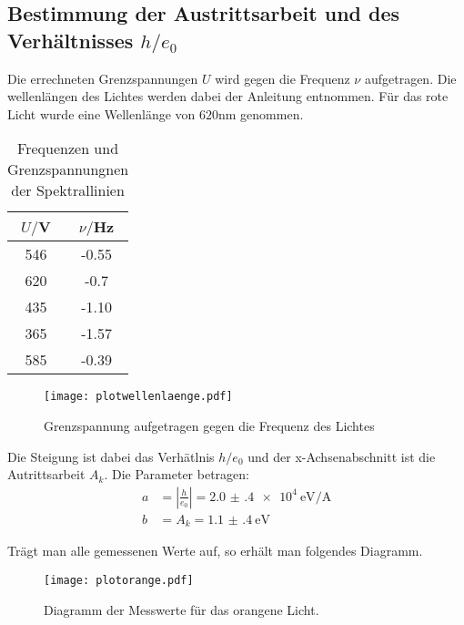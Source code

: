 \subsection{Bestimmung der Austrittsarbeit und des Verhältnisses $h/e_0$}

Die errechneten Grenzspannungen $U$ wird gegen die Frequenz $\nu$ aufgetragen. Die wellenlängen des Lichtes werden dabei der
Anleitung entnommen. Für das rote Licht wurde eine Wellenlänge von $620$nm genommen.


\begin{table}[H]
  \centering
  \caption{Frequenzen und Grenzspannungnen der Spektrallinien}
  \label{tab:Spannungsamplitude}
  \begin{tabular}{c c}
    \toprule
    $U/$V & $\nu/$Hz \\
    \midrule
    546 &     -0.55 \\
    620 &     -0.7 \\
    435 &     -1.10 \\
    365 &     -1.57 \\
    585 &     -0.39 \\
    \bottomrule
  \end{tabular}
\end{table}



\begin{figure}[H]
  \centering
  \texttt{[image: plotwellenlaenge.pdf]}
  \caption{Grenzspannung aufgetragen gegen die Frequenz des Lichtes}
  \label{fig:plotorange}
\end{figure}



Die Steigung ist dabei das Verhätlnis $h/e_0$ und der x-Achsenabschnitt ist die Autrittsarbeit $A_k$.
Die Parameter betragen:
\begin{align*}
  a &=| \frac{h}{e_0} |= \SI{2.0(4)e4}{\eV\per\ampere} \\
  b &= A_k = \SI{1.1(4)}{\eV}
\end{align*}

Trägt man alle gemessenen Werte auf, so erhält man folgendes Diagramm.

\begin{figure}[H]
  \centering
  \texttt{[image: plotorange.pdf]}
  \caption{Diagramm der Messwerte für das orangene Licht.}
  \label{fig:plotorange}
\end{figure}

